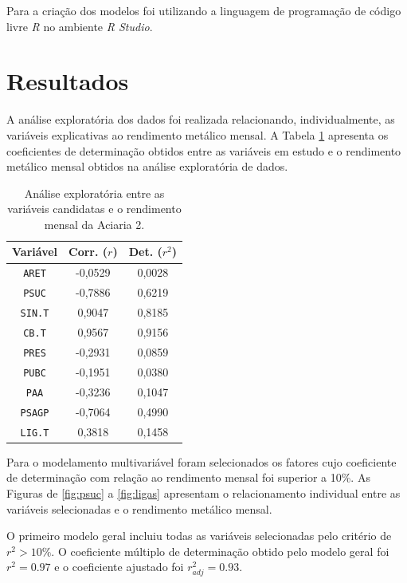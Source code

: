 \begin{multicols}{2}
	Para a criação dos modelos foi utilizando a linguagem de programação de código livre \emph{R}\cite{rcore} no ambiente \emph{R Studio}.
\section{Resultados}
	A análise exploratória dos dados foi realizada relacionando, individualmente, as variáveis explicativas ao rendimento metálico mensal.	A Tabela \ref{tab:corr} apresenta os coeficientes de determinação obtidos entre as variáveis em estudo e o rendimento metálico mensal obtidos na análise exploratória de dados.	
	\begin{table}[H]
		\begin{center}
		\begin{small}
		\caption{Análise exploratória entre as variáveis candidatas e o rendimento mensal da Aciaria 2.}
		\label{tab:corr}
			\begin{tabular}{ccc}
				\hline
				Variável & Corr. ($r$) & Det. ($r^2$) \\
				\hline \hline
				\texttt{ARET} 	& -0,0529 	&  0,0028	\\
				\texttt{PSUC}	& -0,7886	&  0,6219	\\
				\texttt{SIN.T}  &  0,9047	&  0,8185	\\
				\texttt{CB.T}	&  0,9567	&  0,9156	\\
				\texttt{PRES}	& -0,2931	&  0,0859	\\
				\texttt{PUBC}	& -0,1951	&  0,0380	\\
				\texttt{PAA}	& -0,3236	&  0,1047	\\
				\texttt{PSAGP}	& -0,7064	&  0,4990	\\
				\texttt{LIG.T}	&  0,3818	&  0,1458	\\
				\hline
			\end{tabular}
			\end{small}
			\end{center}
	\end{table}	
	Para o modelamento multivariável foram selecionados os fatores cujo coeficiente de determinação com relação ao rendimento mensal foi superior a 10\%. As Figuras de \ref{fig:psuc} a \ref{fig:ligas} apresentam o relacionamento individual entre as variáveis selecionadas e o rendimento metálico mensal. 	
	
	O primeiro modelo geral incluiu todas as variáveis selecionadas pelo critério de $r^2 > 10\%$. O coeficiente múltiplo de determinação obtido pelo modelo geral foi $r^2 = 0.97$ e o coeficiente ajustado foi $r^2_{adj}=0.93$. 
	

\end{multicols}
